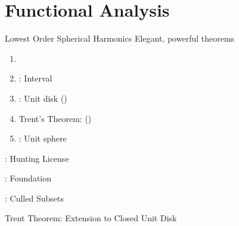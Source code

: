 % 

\section{Functional Analysis}
\begin{frame}{Lowest Order Spherical Harmonics}
Elegant, powerful theorems
\begin{enumerate}
	\item \rfT
	\item \waT: Interval
	\item \mst: Unit disk (\cite{moraguesmuntz, siegel1972muntz})
	\item Trent's Theorem: (\cite{trent1981muntz})
	\item {}: Unit sphere
\end{enumerate}
\end{frame}

\begin{frame}{\rfT: Hunting License}
		
\end{frame}

\begin{frame}{\waT: Foundation}
		
\end{frame}

\begin{frame}{\msT: Culled Subsets}
		
\end{frame}

\begin{frame}{Trent Theorem: Extension to Closed Unit Disk}
			
\end{frame}

\endinput  %
